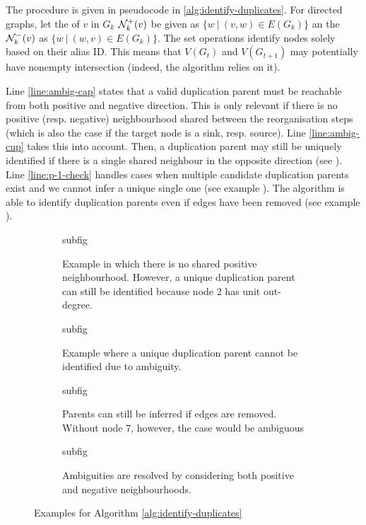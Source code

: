 \documentclass[
	fontsize=10pt, %
	twoside=false, %
	secnumdepth=1, %
  toc=indentunnumbered %
]{kaobook}
\begin{document}
The procedure is given in pseudocode in \ref{alg:identify-duplicates}. For
directed graphs, let the  of $v$ in $G_k$ $\mathcal{N}_k^+(v)$ be
given as $\{w ~|~ (v,w) \in E(G_{k})\}$ an the 
$\mathcal{N}_k^-(v)$ as $\{w ~|~ (w,v) \in E(G_k)\}$.
The set operations identify nodes solely based on their alias ID. This means that
$V(G_t)$ and $V(G_{t+1})$ may potentially have nonempty intersection (indeed,
the algorithm relies on it).

Line \ref{line:ambig-cap} states that a valid duplication parent must be
reachable from both positive and negative direction. This is only relevant if
there is no positive (resp. negative) neighbourhood shared between the
reorganisation steps (which is also the case if the target node is a sink, 
resp. source). Line \ref{line:ambig-cup} takes this into account. Then, a
duplication parent may still be uniquely identified if there is a single shared
neighbour in the opposite direction (see ).
Line \ref{line:p-1-check} handles cases when multiple candidate duplication
parents exist and we cannot infer a unique single one (see example ).
The algorithm is able to identify duplication parents even if edges have been
removed (see example ).

\begin{figure}[h]
  \centering
  \begin{subfigure}{0.23\textwidth}
    subfig
    \caption{Example in which there is no shared positive neighbourhood.
      However, a unique duplication parent can still be identified because node
      2 has unit out-degree.}
    \label{fig:ex-no-neighb}
  \end{subfigure}
  \begin{subfigure}{0.23\textwidth}
    subfig
    \caption{Example where a unique duplication parent cannot be identified
      due to ambiguity.}
    \label{fig:ex-p-1}
  \end{subfigure}
  \begin{subfigure}{0.23\textwidth}
    subfig
    \caption{Parents can still be inferred if edges are removed. Without node 7,
    however, the case would be ambiguous}
    \label{fig:ex-remove-edge}
  \end{subfigure}
  \begin{subfigure}{0.23\textwidth}
    subfig
    \caption{Ambiguities are resolved by considering both positive and negative neighbourhoods.}
    \label{fig:ex-ambig1}
  \end{subfigure}
  \caption{Examples for Algorithm \ref{alg:identify-duplicates}}
  \label{fig:alg-examples}
\end{figure}
\end{document}
